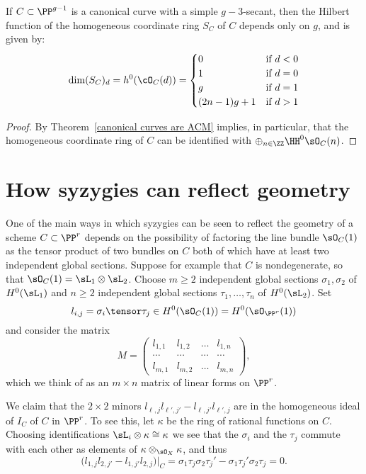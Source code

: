 \begin{corollary}\label{canonical hilbert function}
If $C\subset \PP^{g-1}$ is a canonical curve with a simple $g-3$-secant, then the Hilbert function of the homogeneous coordinate ring $S_{C}$ of  $C$ depends only on $g$, and is given by:
$$
\dim({S_{C}})_{d} = h^{0}(\cO_{C}(d)) = 
\begin{cases}
 0 &\mbox {if } d<0\\
 1 & \mbox {if }  d=0\\
 g & \mbox {if }  d=1\\
 (2n-1)g+1 & \mbox {if }  d>1\\
\end{cases}
$$
\end{corollary}
\begin{proof}
By Theorem~\ref{canonical curves are ACM} implies, in particular, that the homogeneous coordinate ring of $C$ can be identified with $\oplus_{n\in \ZZ}\HH^0\sO_C(n)$.  
\end{proof}

\section{How syzygies can reflect geometry}\label{syzy and geom}

One of the main ways in which syzygies can be seen to reflect the geometry of a scheme $C\subset \PP^r$
depends on the possibility of factoring the line bundle $\sO_C(1)$ as the tensor product of two bundles on $C$
both of which have at least two independent global sections. Suppose for example that $C$ is nondegenerate, 
so that  $\sO_C(1) = \sL_1\otimes \sL_2$. Choose $m\geq 2$ independent global sections
$\sigma_1, \sigma_2$ of  $H^0(\sL_1)$ and $n\geq 2$ independent global sections $\tau_1,\dots, \tau_n$ of $H^0(\sL_2)$. Set
$$
l_{i,j}= \sigma_i\tensor \tau_j \in H^0(\sO_C(1)) = H^0(\sO_{\PP^r}(1))
$$ and consider the matrix 
$$
M = 
\begin{pmatrix}
 l_{1,1}&l_{1,2}&\dots&l_{1,n}\\
 \cdots&\cdots&\cdots&\cdots\\
  l_{m,1}&l_{m,2}&\dots&l_{m,n}
\end{pmatrix},
$$
which we think of as an $m\times n$ matrix of linear forms on $\PP^r$.

We claim that  the $2\times 2$ minors $l_{\ell,j} l_{\ell',j'}-l_{\ell,j'} l_{\ell',j}$ are in the homogeneous ideal of $I_C$ of $C$ in $\PP^r$. 
To see this,
let $\kappa$ be the ring of rational functions on $C$. Choosing identifications $\sL_i\otimes \kappa  \cong \kappa $ we see that the $\sigma_i$ and the $\tau_j$ commute with each other as elements of $\kappa  \otimes_{\sO_X} \kappa $, and thus 
$$
\bigl(l_{1,j} l_{2,j'}-l_{1,j'}l_{2,j}\bigr)|_C = \sigma_1\tau_j\sigma_2\tau_j' - \sigma_1\tau_j'\sigma_2\tau_j =0.
$$

